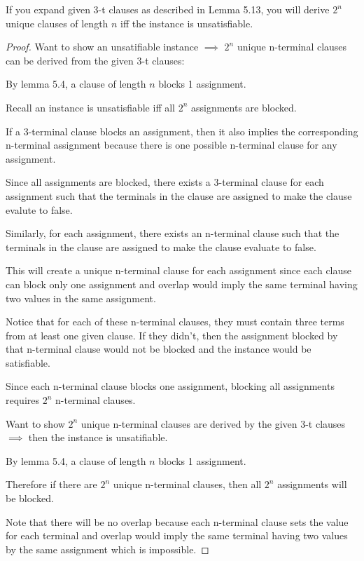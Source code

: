 \documentclass[manuscript]{acmart}
\begin{document}
    \begin{lemma}
        If you expand given 3-t clauses as described in Lemma 5.13, you will
        derive $2^n$ unique clauses of length $n$ iff the instance is unsatisfiable.
    \end{lemma}
    \begin{proof}
        Want to show an unsatifiable instance $\implies$ $2^n$ unique n-terminal
        clauses can be derived from the given 3-t clauses:

        By lemma 5.4, a clause of length $n$ blocks 1 assignment. 

        Recall an instance is unsatisfiable iff all $2^n$ assignments are
        blocked.

        If a 3-terminal clause blocks an assignment, then it also implies
        the corresponding n-terminal assignment because there is one possible
        n-terminal clause for any assignment.

        Since all assignments are blocked, there exists a 3-terminal clause for each
        assignment such that the terminals in the clause are assigned to make
        the clause evalute to false.

        Similarly, for each assignment, there exists an n-terminal clause such
        that the terminals in the clause are assigned to make the clause evaluate
        to false.

        This will create a unique n-terminal clause for each assignment since
        each clause can block only one assignment and overlap would imply
        the same terminal having two values in the same assignment.

        Notice that for each of these n-terminal clauses, they must contain
        three terms from at least one given clause. If they didn't, then
        the assignment blocked by that n-terminal clause would not be blocked
        and the instance would be satisfiable.

        Since each n-terminal clause blocks one assignment, blocking all assignments
        requires $2^n$ n-terminal clauses.

        Want to show $2^n$ unique n-terminal clauses are derived by the given
        3-t clauses $\implies$ then the instance is unsatifiable.

        By lemma 5.4, a clause of length $n$ blocks 1 assignment. 

        Therefore if there are $2^n$ unique n-terminal clauses, then
        all $2^n$ assignments will be blocked.

        Note that there will be no overlap because each n-terminal clause
        sets the value for each terminal and overlap would imply the same
        terminal having two values by the same assignment which is impossible.
    \end{proof}
\end{document}
